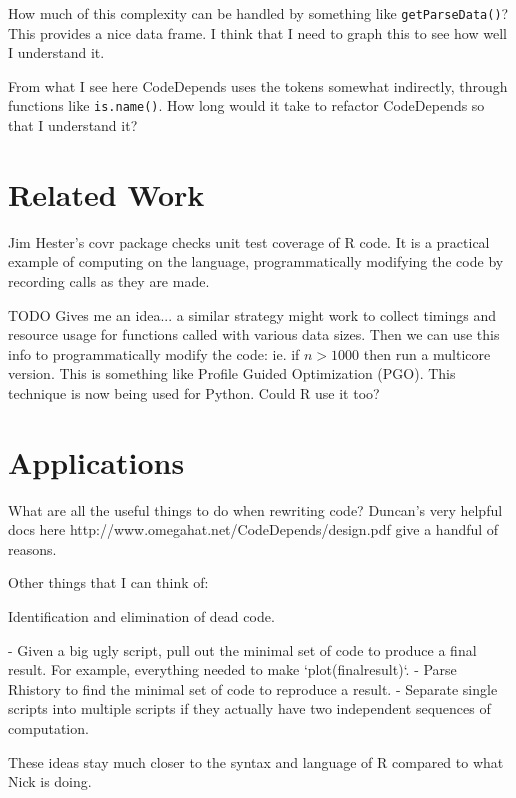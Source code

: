 \documentclass[12pt]{article}
\begin{document}
How much of this complexity can be handled by something like
\texttt{getParseData()}? This provides a nice data frame. I think that I
need to graph this to see how well I understand it.

From what I see here CodeDepends uses the tokens
somewhat indirectly, through functions like \texttt{is.name()}. 
How long would it take to refactor CodeDepends so that I understand it?



\section{Related Work}

Jim Hester's covr package \cite{R-covr} checks unit test coverage of R
code. It is a practical example of computing on the language,
programmatically modifying the code by recording calls as they are made.

TODO Gives me an idea... a similar strategy might work to collect timings and
resource usage for functions called with various data sizes. Then we can
use this info to programmatically modify the code: ie. if $n > 1000$ then
run a multicore version. This is something like Profile Guided Optimization
(PGO). This technique is now being used for Python. Could R use it too?

\section{Applications}


What are all the useful things to do when rewriting code?  Duncan's very
helpful docs here http://www.omegahat.net/CodeDepends/design.pdf give a
handful of reasons.

Other things that I can think of:

Identification and elimination of dead code.

- Given a big ugly script, pull out the minimal set of code to produce a
  final result. For example, everything needed to make `plot(finalresult)`.
- Parse Rhistory to find the minimal set of code to reproduce a result.
- Separate single scripts into multiple scripts if they actually have two
  independent sequences of computation.

These ideas stay much closer to the syntax and language of R compared to
what Nick is doing.
\end{document}
